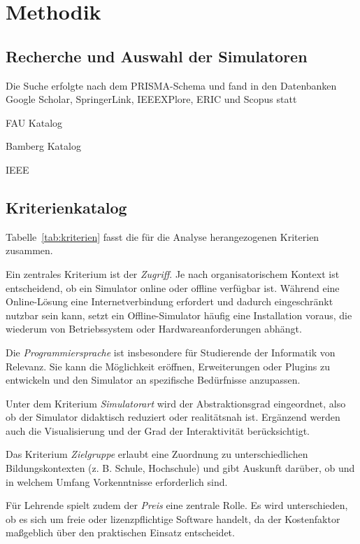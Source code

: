 \chapter{Methodik}

\section{Recherche und Auswahl der Simulatoren}

Die Suche erfolgte nach dem PRISMA-Schema und fand in den Datenbanken Google Scholar,
SpringerLink, IEEEXPlore, ERIC und Scopus statt

FAU Katalog

Bamberg Katalog

IEEE

\section{Kriterienkatalog}

Tabelle~\ref{tab:kriterien} fasst die für die Analyse herangezogenen Kriterien zusammen.


Ein zentrales Kriterium ist der \textit{Zugriff}. Je nach organisatorischem Kontext ist entscheidend, ob ein Simulator online oder offline verfügbar ist. Während eine Online-Lösung eine Internetverbindung erfordert und dadurch eingeschränkt nutzbar sein kann, setzt ein Offline-Simulator häufig eine Installation voraus, die wiederum von Betriebssystem oder Hardwareanforderungen abhängt.

Die \textit{Programmiersprache} ist insbesondere für Studierende der Informatik von Relevanz. Sie kann die Möglichkeit eröffnen, Erweiterungen oder Plugins zu entwickeln und den Simulator an spezifische Bedürfnisse anzupassen.

Unter dem Kriterium \textit{Simulatorart} wird der Abstraktionsgrad eingeordnet, also ob der Simulator didaktisch reduziert oder realitätsnah ist. Ergänzend werden auch die Visualisierung und der Grad der Interaktivität berücksichtigt.

Das Kriterium \textit{Zielgruppe} erlaubt eine Zuordnung zu unterschiedlichen Bildungskontexten (z. B. Schule, Hochschule) und gibt Auskunft darüber, ob und in welchem Umfang Vorkenntnisse erforderlich sind.

Für Lehrende spielt zudem der \textit{Preis} eine zentrale Rolle. Es wird unterschieden, ob es sich um freie oder lizenzpflichtige Software handelt, da der Kostenfaktor maßgeblich über den praktischen Einsatz entscheidet.

